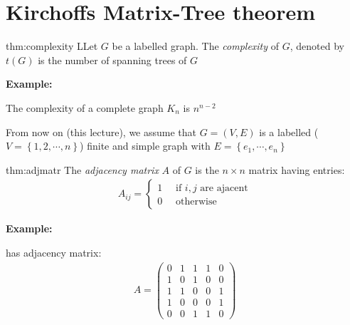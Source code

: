 \section{Kirchoffs Matrix-Tree theorem}\par
\begin{theo}[Complexity]{thm:complexity}
  LLet $G$ be a labelled graph. The \textit{complexity} of $G$, denoted by $t(G)$ is the number of spanning trees of $G$
\end{theo}
\par\bigskip
\noindent\textbf{Example:}\par
\noindent The complexity of a complete graph $K_n$ is $n^{n-2}$
\par\bigskip
\noindent From now on (this lecture), we assume that $G = (V,E)$ is a labelled ($V = \left\{1,2,\cdots,n\right\}$) finite and simple graph with $E = \left\{e_1,\cdots, e_n\right\}$
\par\bigskip
\begin{theo}{thm:adjmatr}
  The \textit{adjacency matrix} $A$ of $G$ is the $n\times n$ matrix having entries:
  \begin{equation*}
    \begin{gathered}
      A_{ij} = \begin{cases}1\quad \text{ if $i,j$ are ajacent}\\0\quad\text{ otherwise}\end{cases}
    \end{gathered}
  \end{equation*}
\end{theo}
\par\bigskip
\noindent\textbf{Example:}\par
\noindent has adjacency matrix:
\begin{equation*}
  \begin{gathered}
    A = \begin{pmatrix}0&1&1&1&0\\1&0&1&0&0\\1&1&0&0&1\\1&0&0&0&1\\0&0&1&1&0\end{pmatrix}
  \end{gathered}
\end{equation*}
